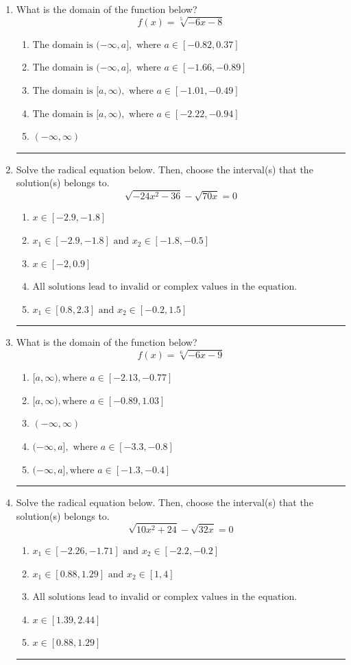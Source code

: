 \documentclass[14pt]{extbook}
\newcommand{\litem}[1]{\item#1\hspace*{-1cm}\rule{\textwidth}{0.4pt}}
\begin{document}
\begin{enumerate}
{\begin{enumerate}[label=\Alph*.]
\end{enumerate} }
\litem{
What is the domain of the function below?\[ f(x) = \sqrt[5]{-6 x - 8} \]\begin{enumerate}[label=\Alph*.]
\item \( \text{The domain is } (-\infty, a], \text{   where } a \in [-0.82, 0.37] \)
\item \( \text{The domain is } (-\infty, a], \text{   where } a \in [-1.66, -0.89] \)
\item \( \text{The domain is } [a, \infty), \text{   where } a \in [-1.01, -0.49] \)
\item \( \text{The domain is } [a, \infty), \text{   where } a \in [-2.22, -0.94] \)
\item \( (-\infty, \infty) \)

\end{enumerate} }
\litem{
Solve the radical equation below. Then, choose the interval(s) that the solution(s) belongs to.\[ \sqrt{-24 x^2 - 36} - \sqrt{70 x} = 0 \]\begin{enumerate}[label=\Alph*.]
\item \( x \in [-2.9,-1.8] \)
\item \( x_1 \in [-2.9, -1.8] \text{ and } x_2 \in [-1.8,-0.5] \)
\item \( x \in [-2,0.9] \)
\item \( \text{All solutions lead to invalid or complex values in the equation.} \)
\item \( x_1 \in [0.8, 2.3] \text{ and } x_2 \in [-0.2,1.5] \)

\end{enumerate} }
\litem{
What is the domain of the function below?\[ f(x) = \sqrt[6]{-6 x - 9} \]\begin{enumerate}[label=\Alph*.]
\item \( [a, \infty), \text{where } a \in [-2.13, -0.77] \)
\item \( [a, \infty), \text{where } a \in [-0.89, 1.03] \)
\item \( (-\infty, \infty) \)
\item \( (-\infty, a], \text{ where } a \in [-3.3, -0.8] \)
\item \( (-\infty, a], \text{where } a \in [-1.3, -0.4] \)

\end{enumerate} }
\litem{
Solve the radical equation below. Then, choose the interval(s) that the solution(s) belongs to.\[ \sqrt{10 x^2 + 24} - \sqrt{32 x} = 0 \]\begin{enumerate}[label=\Alph*.]
\item \( x_1 \in [-2.26, -1.71] \text{ and } x_2 \in [-2.2,-0.2] \)
\item \( x_1 \in [0.88, 1.29] \text{ and } x_2 \in [1,4] \)
\item \( \text{All solutions lead to invalid or complex values in the equation.} \)
\item \( x \in [1.39,2.44] \)
\item \( x \in [0.88,1.29] \)


\end{enumerate}}
\end{enumerate}
\end{document}
